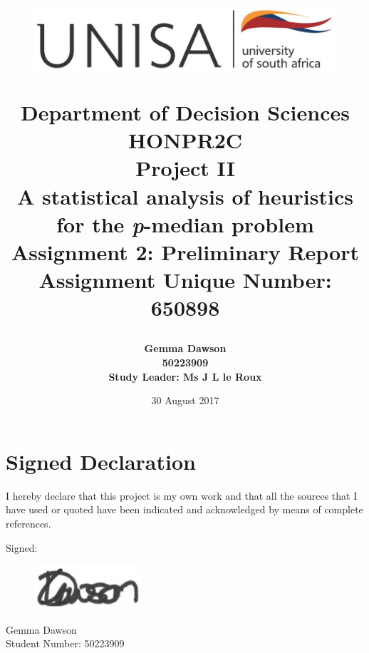 \documentclass[11pt]{article}
\newcommand{\np}{\newpage}
\begin{document}
	\title{
		\begin{figure}[!htb]
			\begin{center}
				\includegraphics[width=12cm]{unisa.png}
			\end{center}
		\end{figure}
		Department of Decision Sciences\\[3mm]
		HONPR2C\\
		Project II \\[2cm]		
		{\huge \textbf{A statistical analysis of heuristics for the \emph{p}-median problem}}\\[15mm]
		Assignment 2: Preliminary Report\\[3mm]
		Assignment Unique Number: 650898\\[2cm]
	}
	\author{\textbf{\Large Gemma Dawson}\\[3mm]
		\textbf{\Large 50223909}\\[3mm]
		\textbf{Study Leader: Ms J L le Roux}
	}
	\date{\Large 30 August 2017}	
	\maketitle
	\thispagestyle{empty}
	\np
	
	\section*{Signed Declaration}
	I hereby declare that this project is my own work and that all the sources that I have used or quoted have been indicated and acknowledged by means of complete references.
	
	Signed:
	\begin{figure}[!htb]
			\includegraphics[width=4cm]{signature.png}
	\end{figure}

	Gemma Dawson\\
	Student Number: 50223909\\
	
\end{document}
